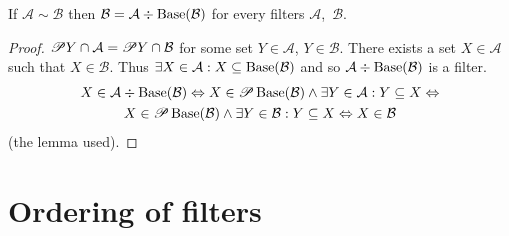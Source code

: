 \begin{prop}
If $\mathcal{A}\sim\mathcal{B}$ then $\mathcal{B}=\mathcal{A}\div\operatorname{Base}(\mathcal{B})$
for every filters $\mathcal{A}$,~$\mathcal{B}$.\end{prop}
\begin{proof}
$\mathscr{P} Y\cap\mathcal{A}=\mathscr{P} Y\cap\mathcal{B}$ for some set
$Y\in\mathcal{A}$, $Y\in\mathcal{B}$. There exists a set $X\in\mathcal{A}$
such that $X\in\mathcal{B}$. Thus $\exists X\in\mathcal{A}:X\subseteq\operatorname{Base}(\mathcal{B})$
and so $\mathcal{A}\div\operatorname{Base}(\mathcal{B})$ is a filter.
\begin{multline*}
X\in\mathcal{A}\div\operatorname{Base}(\mathcal{B})\Leftrightarrow X\in\mathscr{P}\operatorname{Base}(\mathcal{B})\land\exists Y\in\mathcal{A}:Y\subseteq X\Leftrightarrow\\
X\in\mathscr{P}\operatorname{Base}(\mathcal{B})\land\exists Y\in\mathcal{B}:Y\subseteq X\Leftrightarrow X\in\mathcal{B}
\end{multline*}
(the lemma used).
\end{proof}

\section{Ordering of filters}

